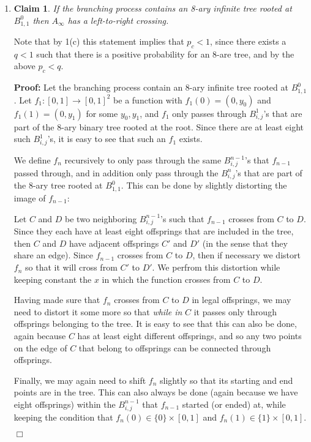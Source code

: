 \documentclass[11pt]{article} \usepackage{amssymb}
\newtheorem{claim}[theorem]{Claim}
\newenvironment{proof}{\noindent \textbf{Proof:}}{$\Box$}
\begin{document}
\begin{enumerate}
\begin{enumerate}
    \item
      \begin{claim}
        If the branching process contains an 8-ary infinite tree rooted
        at $B_{1,1}^0$ then $A_\infty$ has a left-to-right crossing.
      \end{claim}
      Note that by 1(c) this statement implies that $p_c<1$, since there exists
      a $q<1$ such that there is a positive probability for an 8-are tree,
      and by the above $p_c<q$.

      \begin{proof}
        Let the branching process contain an 8-ary infinite tree rooted at 
        $B_{1,1}^0$.
        Let $f_1:[0,1]\to [0,1]^2$ be a function with $f_1(0)=(0,y_0)$ and 
        $f_1(1)=(0,y_1)$ for some $y_0,y_1$, and $f_1$ only passes through
        $B_{i,j}^1$'s that are part of the 8-ary binary tree rooted at the root.
        Since there are at least eight such $B_{i,j}^1$'s, it is easy to see 
        that such an $f_1$ exists.

        We define $f_n$ recursively to only pass through the same $B_{i,j}^{n-1}$'s
        that $f_{n-1}$ passed through, and in addition only pass through
        the $B_{i,j}^n$'s that are
        part of the 8-ary tree rooted at $B_{1,1}^0$. This can be done by slightly 
        distorting the image of $f_{n-1}$:

        Let $C$ and $D$ be
        two neighboring 
        $B_{i,j}^{n-1}$'s such that $f_{n-1}$ crosses from $C$ to $D$. Since they each have at 
        least eight offsprings that are included in the tree, then $C$ and $D$
        have adjacent offsprings $C'$ and $D'$ (in the sense that they share an 
        edge).
        Since $f_{n-1}$ crosses from $C$ to $D$, then if necessary we distort $f_n$ so 
        that it will cross from
        $C'$ to $D'$. We perfrom this distortion while keeping constant the $x$
        in which the function crosses from $C$ to $D$.
        
        Having made sure that $f_n$ crosses from $C$ to $D$ in legal offsprings,
        we may need to distort it some more so that {\em while in} $C$ it 
        passes only
        through offsprings belonging to the tree. It is easy to see that this
        can also be done, again because $C$ has at least eight different 
        offsprings, and so any two points on the edge of $C$ that belong to
        offsprings can be connected through offsprings.

        Finally, we may again need to shift $f_n$ slightly so that its starting
        and end points are in the tree. This can also always be done (again
        because we have eight offsprings) within
        the $B_{i,j}^{n-1}$ that $f_{n-1}$ started (or ended) at, while keeping the condition
        that $f_n(0)\in\{0\}\times [0,1]$ and $f_n(1)\in\{1\}\times [0,1]$.
        

\end{proof}
\end{enumerate}
\end{enumerate}
\end{document}
